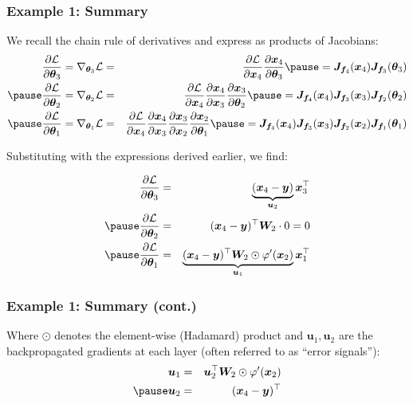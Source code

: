 \documentclass[smaller]{beamer}
\begin{document}
\begin{frame}
  \frametitle{Example 1: Summary}\pause
 We recall the chain rule of derivatives and express as products of Jacobians:  
 \begin{eqnarray}
    \pd{\mc L}{\bm\th_3} = \nabla_{\bm\th_3}\mc L &=& \pd{\mc L}{\bm x_4} \pd{\bm x_4}{\bm\th_3} \pause = 
    \bm J_{\bm f_4}(\bm x_4) \bm J_{\bm f_3}(\bm \th_3) \\\pause
    \pd{\mc L}{\bm\th_2}  = \nabla_{\bm\th_2}\mc L &=& \pd{\mc L}{\bm x_4} \pd{\bm x_4}{\bm x_3} \pd{\bm x_3}{\bm\th_2} \pause =
    \bm J_{\bm f_4}(\bm x_4) \bm J_{\bm f_3}(\bm x_3) \bm J_{\bm f_2}(\bm\th_2) \\ \pause
    \pd{\mc L}{\bm\th_1}  = \nabla_{\bm\th_1}\mc L &=& \pd{\mc L}{\bm x_4} \pd{\bm x_4}{\bm x_3} \pd{\bm x_3}{\bm x_2} \pd{\bm x_2}{\bm\th_1} \pause  = 
    \bm J_{\bm f_4}(\bm x_4) \bm J_{\bm f_3}(\bm x_3) \bm J_{\bm f_2}(\bm x_2) \bm J_{\bm f_1}(\bm\th_1)
  \end{eqnarray}

Substituting with the expressions derived earlier, we find: 

\begin{eqnarray}
    \pd{\mc L}{\bm\th_3} &=& \underbrace{(\bm x_4 - \bm y)}_{\bm u_2} \bm x_3\tr \\\pause
    \pd{\mc L}{\bm\th_2} &=& (\bm x_4 - \bm y)\tr \bm W_2 \cdot 0 = 0 \\ \pause
    \pd{\mc L}{\bm\th_1} &=& \underbrace{(\bm x_4 - \bm y)\tr \bm W_2 \odot \varphi'(\bm x_2)}_{\bm u_1}  \bm x_1\tr
\end{eqnarray}
  
\end{frame}

\begin{frame}
  \frametitle{Example 1: Summary (cont.)}\pause
Where $\odot$ denotes the element-wise (Hadamard) product and $\bm u_1, \bm u_2$ are the backpropagated gradients at each layer (often referred to as ``error signals''):
\begin{eqnarray}
  \bm u_1 &=& \bm u_2 \tr \bm W_2 \odot \varphi'(\bm x_2) \\\pause
  \bm u_2 &=& (\bm x_4 - \bm y)\tr
\end{eqnarray}
\end{frame}
\end{document}
